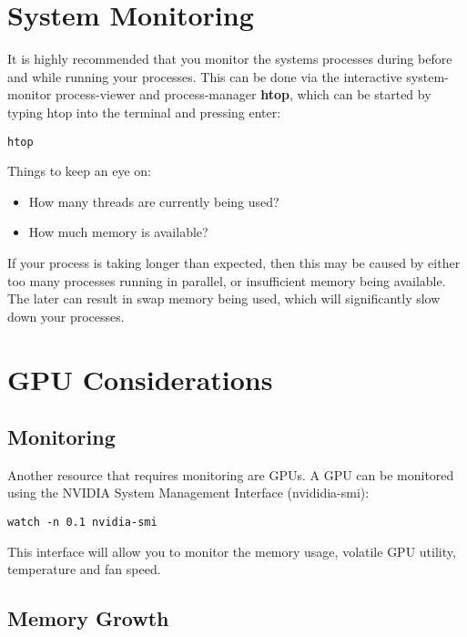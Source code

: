 \documentclass[
]{book}
\providecommand{\tightlist}{%
  \setlength{\itemsep}{0pt}\setlength{\parskip}{0pt}}
\begin{document}
\hypertarget{system-monitoring}{%
\section{System Monitoring}\label{system-monitoring}}

It is highly recommended that you monitor the systems processes during before and while running your processes. This can be done via the interactive system-monitor process-viewer and process-manager \textbf{htop}, which can be started by typing htop into the terminal and pressing enter:

\begin{verbatim}
htop
\end{verbatim}

Things to keep an eye on:

\begin{itemize}
\tightlist
\item
  How many threads are currently being used?
\item
  How much memory is available?
\end{itemize}

If your process is taking longer than expected, then this may be caused by either too many processes running in parallel, or insufficient memory being available. The later can result in swap memory being used, which will significantly slow down your processes.

\hypertarget{gpu-considerations}{%
\section{GPU Considerations}\label{gpu-considerations}}

\hypertarget{monitoring}{%
\subsection{Monitoring}\label{monitoring}}

Another resource that requires monitoring are GPUs. A GPU can be monitored using the NVIDIA System Management Interface (nvididia-smi):

\begin{verbatim}
watch -n 0.1 nvidia-smi
\end{verbatim}

This interface will allow you to monitor the memory usage, volatile GPU utility, temperature and fan speed.

\hypertarget{memory-growth}{%
\subsection{Memory Growth}\label{memory-growth}}
\end{document}
